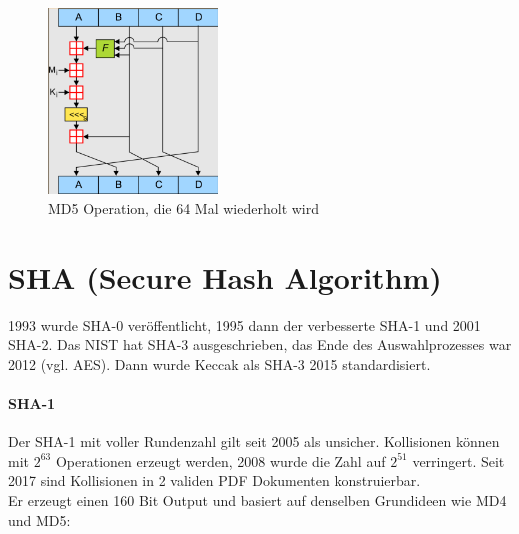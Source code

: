 \begin{figure}[h]
    \includegraphics[width=0.4\textwidth]{figures/fig09-md5}
    \centering
    \caption{MD5 Operation, die 64 Mal wiederholt wird}
\end{figure}


\section{SHA (Secure Hash Algorithm)}

1993 wurde SHA-0 veröffentlicht, 1995 dann der verbesserte SHA-1 und 2001 SHA-2. Das NIST hat SHA-3 ausgeschrieben, das Ende des Auswahlprozesses war 2012 (vgl. AES).
Dann wurde Keccak als SHA-3 2015 standardisiert. \\

\paragraph{SHA-1}
Der SHA-1 mit voller Rundenzahl gilt seit 2005 als unsicher. Kollisionen können mit $2^{63}$ Operationen erzeugt werden, 2008 wurde die Zahl auf $2^{51}$ verringert.
Seit 2017 sind Kollisionen in 2 validen PDF Dokumenten konstruierbar. \\

Er erzeugt einen 160 Bit Output und basiert auf denselben Grundideen wie MD4 und MD5:

